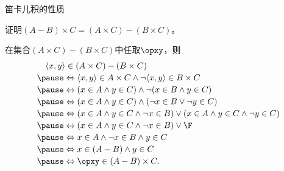 \begin{frame}{笛卡儿积的性质}
\pause
\begin{exam}
证明$(A-B) \times C=(A \times C)-(B \times C)$。
\end{exam}
\pause
\vspace{1ex}
在集合$(A \times C)-(B \times C)$中任取$\opxy$，\pause 则
\begin{equation*}\begin{array}{l}
\quad\langle x, y\rangle \in(A \times C)-(B \times C) \\[2pt]\pause
\Leftrightarrow\langle x, y\rangle \in A \times C \wedge \neg\langle x, y\rangle \in B \times C \\[2pt]\pause
\Leftrightarrow(x \in A \wedge y \in C) \wedge \neg(x \in B \wedge y \in C) \\[2pt]\pause
\Leftrightarrow(x \in A \wedge y \in C) \wedge(\neg x \in B \vee \neg y \in C) \\[2pt]\pause
\Leftrightarrow(x \in A \wedge y \in C \wedge \neg x \in B) \vee(x \in A \wedge y \in C \wedge \neg y \in C) \\[2pt]\pause
\Leftrightarrow(x \in A \wedge y \in C \wedge \neg x \in B) \vee \F \\[2pt]\pause
\Leftrightarrow x \in A \wedge \neg x \in B \wedge y \in C \\[2pt]\pause
\Leftrightarrow x\in(A-B) \wedge y \in C\\[2pt]\pause
\Leftrightarrow \opxy \in (A-B)\times C.
\end{array}\end{equation*}
\end{frame}


